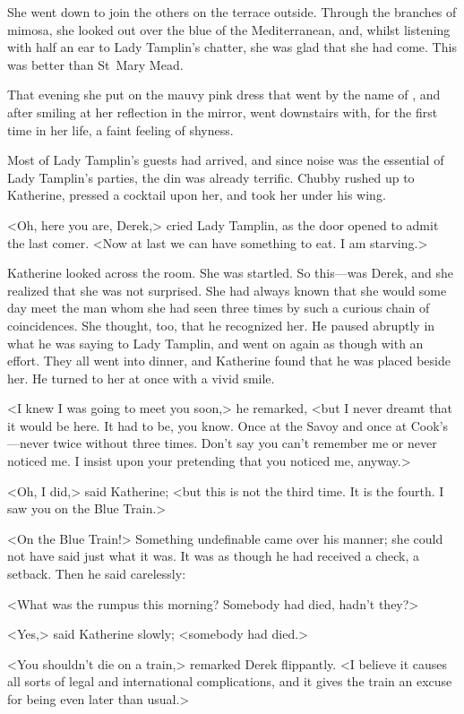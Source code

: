 She went down to join the others on the terrace outside. Through the branches of mimosa, she looked out over the blue of the Mediterranean, and, whilst listening with half an ear to Lady Tamplin's chatter, she was glad that she had come. This was better than St~Mary Mead.

That evening she put on the mauvy pink dress that went by the name of , and after smiling at her reflection in the mirror, went downstairs with, for the first time in her life, a faint feeling of shyness.

Most of Lady Tamplin's guests had arrived, and since noise was the essential of Lady Tamplin's parties, the din was already terrific. Chubby rushed up to Katherine, pressed a cocktail upon her, and took her under his wing.

<Oh, here you are, Derek,> cried Lady Tamplin, as the door opened to admit the last comer. <Now at last we can have something to eat. I am starving.>

Katherine looked across the room. She was startled. So this—was Derek, and she realized that she was not surprised. She had always known that she would some day meet the man whom she had seen three times by such a curious chain of coincidences. She thought, too, that he recognized her. He paused abruptly in what he was saying to Lady Tamplin, and went on again as though with an effort. They all went into dinner, and Katherine found that he was placed beside her. He turned to her at once with a vivid smile.

<I knew I was going to meet you soon,> he remarked, <but I never dreamt that it would be here. It had to be, you know. Once at the Savoy and once at Cook's—never twice without three times. Don't say you can't remember me or never noticed me. I insist upon your pretending that you noticed me, anyway.>

<Oh, I did,> said Katherine; <but this is not the third time. It is the fourth. I saw you on the Blue Train.>

<On the Blue Train!> Something undefinable came over his manner; she could not have said just what it was. It was as though he had received a check, a setback. Then he said carelessly:

<What was the rumpus this morning? Somebody had died, hadn't they?>

<Yes,> said Katherine slowly; <somebody had died.>

<You shouldn't die on a train,> remarked Derek flippantly. <I believe it causes all sorts of legal and international complications, and it gives the train an excuse for being even later than usual.>

